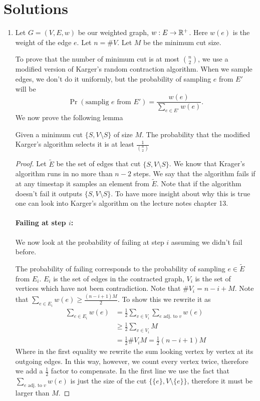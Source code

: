 \documentclass[11pt]{article}
\begin{document}
\section*{Solutions}
\begin{enumerate}
    \item Let $G=(V,E,w)$ be our weighted graph, $w:E\to \mathbb{R}^+$. Here $w(e)$ is the weight of the edge $e$. Let $n = \#V$. Let $M$ be the minimum cut size. 
    
    To prove that the number of minimum cut is at most $\binom{n}{2}$, we use a modified version of Karger's random contraction algorithm. When we sample edges, we don't do it uniformly, but the probability of sampling $e$ from $E'$ will be 
    \begin{equation*}
        \Pr(\text{samplig }e \text{ from }E') = \frac{w(e)}{\sum_{e\in E'}w(e)}.
    \end{equation*}
    We now prove the following lemma
    \begin{lemma}\label{l1} Given a minimum cut $\{S,V\setminus S\}$ of size $M$. The probability that the modified Karger's algorithm selects it is at least $\frac{1}{\binom{n}{2}}$
    \end{lemma}
    \begin{proof}
        Let $\tilde E$ be the set of edges that cut $\{S,V\setminus S\}$. We know that Krager's algorithm runs in no more than $n-2$ steps. We say that the algorithm fails if at any timestap it samples an element from $\tilde E$. Note that if the algorithm doesn't fail it outputs $\{S,V\setminus S\}$. To have more insight about why this is true one can look into Karger's algorithm on the lecture notes chapter 13.

        \paragraph*{Failing at step $i$:} We now look at the probability of failing at step $i$ assuming we didn't fail before.

        The probability of failing corresponds to the probability of sampling $e\in \tilde E$ from $E_i$. $E_i$ is the set of edges in the contracted graph, $V_i$ is the set of vertices which have not been contradiction. Note that $\# V_i = n - i + M$. Note that $\sum_{e \in E_i}w(e)\geq \frac{(n-i+1)M}{2}$. To show this we rewrite it as
        \begin{align*}
            \sum_{e \in E_i}w(e) &= \frac{1}{2} \sum_{v \in V_i}\sum_{e \text{ adj. to }v} w(e) \\
            & \geq  \frac{1}{2}\sum_{v \in V_i}M \\
            & = \frac{1}{2}\#V_i M = \frac{1}{2}(n-i+1)M
        \end{align*}
        Where in the first equality we rewrite the sum looking vertex by vertex at its outgoing edges. In this way, however, we count every vertex twice, therefore we add a $\frac{1}{2}$ factor to compensate. In the first line we use the fact that $\sum_{e \text{ adj. to }v} w(e)$ is just the size of the cut $\{\{e\},V\setminus \{e\}\}$, therefore it must be larger than $M$.


\end{proof}
\end{enumerate}
\end{document}
